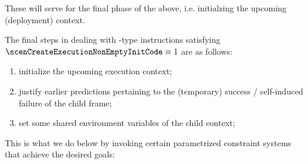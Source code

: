 These will serve for the final phase of the above, i.e. initialzing the upcoming (deployment) context.

The final steps in dealing with -type instructions satisfying $\scenCreateExecutionNonEmptyInitCode \equiv 1$ are as follows:
\begin{enumerate}
        \item initialize the upcoming execution context;
	\item justify earlier predictions pertaining to the (temporary) success / self-induced failure of the child frame;
	\item set some shared environment variables of the child context;
\end{enumerate}
This is what we do below by invoking certain parametrized constraint systems that achieve the desired goals:
